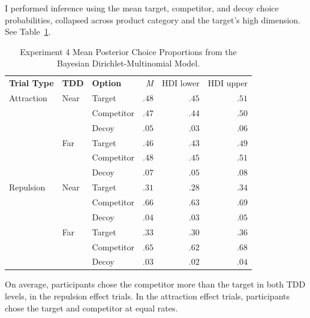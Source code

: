 I performed inference using the mean target, competitor, and decoy choice probabilities, collapsed across product category and the target's high dimension. See Table~\ref{tab:e4_choice_params}.

\begin{table}[ht]
    \centering
    \begin{tabular}{lllrrr}
        \toprule
        \textbf{Trial Type} & \textbf{TDD} & \textbf{Option} & \textit{M} & HDI lower & HDI upper \\
        Attraction          & Near         & Target          &  $.48$     & $.45$     & $.51$     \\
                            &              & Competitor      &  $.47$     & $.44$     & $.50$     \\
                            &              & Decoy           &  $.05$     & $.03$     & $.06$     \\
                            & Far          & Target          &  $.46$     & $.43$     & $.49$     \\
                            &              & Competitor      &  $.48$     & $.45$     & $.51$     \\
                            &              & Decoy           &  $.07$     & $.05$     & $.08$     \\
        Repulsion           & Near         & Target          &  $.31$     & $.28$     & $.34$     \\
                            &              & Competitor      &  $.66$     & $.63$     & $.69$     \\
                            &              & Decoy           &  $.04$     & $.03$     & $.05$     \\
                            & Far          & Target          &  $.33$     & $.30$     & $.36$     \\
                            &              & Competitor      &  $.65$     & $.62$     & $.68$     \\
                            &              & Decoy           &  $.03$     & $.02$     & $.04$     \\
        \bottomrule
    \end{tabular}
    \caption{Experiment 4 Mean Posterior Choice Proportions from the Bayesian Dirichlet-Multinomial Model.}
    \label{tab:e4_choice_params}
\end{table}

On average, participants chose the competitor more than the target in both TDD levels, in the repulsion effect trials. In the attraction effect trials, participants chose the target and competitor at equal rates. 

